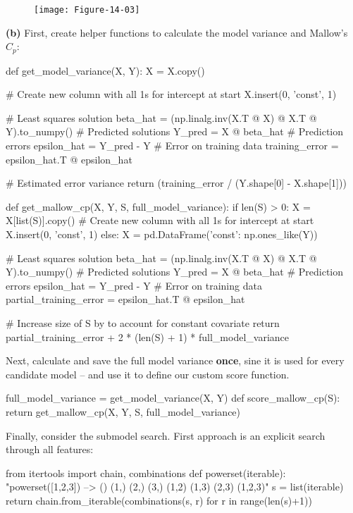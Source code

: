 \begin{figure}[H]
\centering
\texttt{[image: Figure-14-03]}
\end{figure}

\textbf{(b)}
First,  create helper functions to calculate the model variance and
Mallow's \(C_p\):

\begin{python}
def get_model_variance(X, Y):
    X = X.copy()
    
    # Create new column with all 1s for intercept at start
    X.insert(0, 'const', 1)
    
    # Least squares solution
    beta_hat = (np.linalg.inv(X.T @ X) @ X.T @ Y).to_numpy()
    # Predicted solutions
    Y_pred = X @ beta_hat
    # Prediction errors
    epsilon_hat = Y_pred - Y
    # Error on training data
    training_error = epsilon_hat.T @ epsilon_hat
    
    # Estimated error variance
    return (training_error / (Y.shape[0] - X.shape[1]))
    
def get_mallow_cp(X, Y, S, full_model_variance):
    if len(S) > 0:
        X = X[list(S)].copy()
        # Create new column with all 1s for intercept at start
        X.insert(0, 'const', 1)
    else:
        X = pd.DataFrame({'const': np.ones_like(Y)})
    
    # Least squares solution
    beta_hat = (np.linalg.inv(X.T @ X) @ X.T @ Y).to_numpy()
    # Predicted solutions
    Y_pred = X @ beta_hat
    # Prediction errors
    epsilon_hat = Y_pred - Y
    # Error on training data
    partial_training_error = epsilon_hat.T @ epsilon_hat
    
    # Increase size of S by to account for constant covariate
    return partial_training_error + 2 * (len(S) + 1) * full_model_variance
\end{python}
Next,  calculate and save the full model variance \textbf{once},
sine it is used for every candidate model -- and use it to define our
custom score function.

\begin{python}
full_model_variance = get_model_variance(X, Y)
def score_mallow_cp(S):
    return get_mallow_cp(X, Y, S, full_model_variance)
\end{python}
Finally, consider the submodel search.
First approach is an explicit search through all features:

\begin{python}
from itertools import chain, combinations
def powerset(iterable):
    "powerset([1,2,3]) --> () (1,) (2,) (3,) (1,2) (1,3) (2,3) (1,2,3)"
    s = list(iterable)
    return chain.from_iterable(combinations(s, r) for r in range(len(s)+1))
\end{python}

